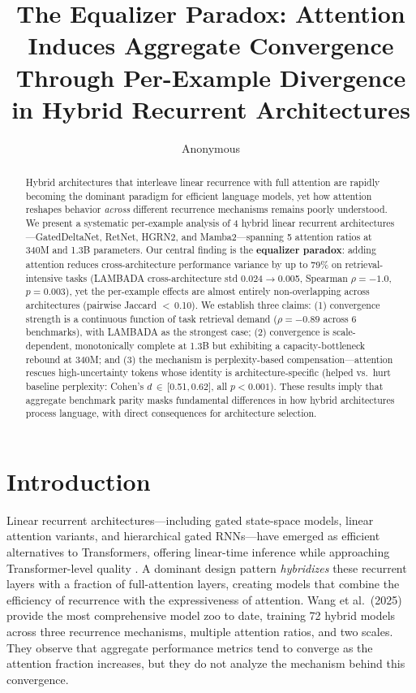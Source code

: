 \documentclass[11pt,a4paper]{article}
\title{The Equalizer Paradox: Attention Induces Aggregate Convergence\\Through Per-Example Divergence in Hybrid Recurrent Architectures}
\author{Anonymous}
\date{}
\begin{document}
\maketitle

\begin{abstract}
Hybrid architectures that interleave linear recurrence with full attention are rapidly becoming the dominant paradigm for efficient language models, yet how attention reshapes behavior \emph{across} different recurrence mechanisms remains poorly understood.
We present a systematic per-example analysis of 4 hybrid linear recurrent architectures---GatedDeltaNet, RetNet, HGRN2, and Mamba2---spanning 5 attention ratios at 340M and 1.3B parameters.
Our central finding is the \textbf{equalizer paradox}: adding attention reduces cross-architecture performance variance by up to 79\% on retrieval-intensive tasks (LAMBADA cross-architecture std 0.024$\to$0.005, Spearman $\rho{=}{-}1.0$, $p{=}0.003$), yet the per-example effects are almost entirely non-overlapping across architectures (pairwise Jaccard $<$\,0.10).
We establish three claims: (1) convergence strength is a continuous function of task retrieval demand ($\rho{=}{-}0.89$ across 6 benchmarks), with LAMBADA as the strongest case; (2) convergence is scale-dependent, monotonically complete at 1.3B but exhibiting a capacity-bottleneck rebound at 340M; and (3) the mechanism is perplexity-based compensation---attention rescues high-uncertainty tokens whose identity is architecture-specific (helped vs.\ hurt baseline perplexity: Cohen's $d$\,$\in$\,[0.51,\,0.62], all $p<0.001$).
These results imply that aggregate benchmark parity masks fundamental differences in how hybrid architectures process language, with direct consequences for architecture selection.
\end{abstract}

\section{Introduction}

Linear recurrent architectures---including gated state-space models, linear attention variants, and hierarchical gated RNNs---have emerged as efficient alternatives to Transformers, offering linear-time inference while approaching Transformer-level quality \citep{wang2025mamba}.
A dominant design pattern \emph{hybridizes} these recurrent layers with a fraction of full-attention layers, creating models that combine the efficiency of recurrence with the expressiveness of attention.
Wang et al.\ (2025) provide the most comprehensive model zoo to date, training 72 hybrid models across three recurrence mechanisms, multiple attention ratios, and two scales.
They observe that aggregate performance metrics tend to converge as the attention fraction increases, but they do not analyze the mechanism behind this convergence.
\end{document}

